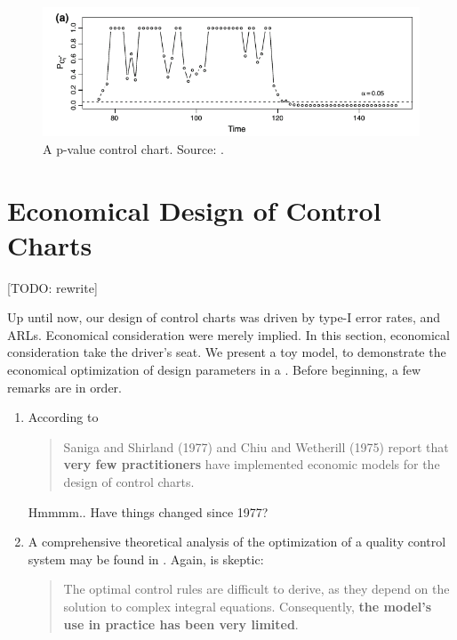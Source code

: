 \begin{figure}[t]
\centering
\includegraphics[width=0.7\linewidth]{art/p-value-chart}
\caption{A p-value control chart. Source: \cite{li_using_2012}.}
\label{fig:p-value-chart}
\end{figure}





\section{Economical Design of Control Charts}
\label{sec:economical_considerations}

[TODO: rewrite]


Up until now, our design of control charts was driven by type-I error rates, and ARLs. Economical consideration were merely implied.
In this section, economical consideration take the driver's seat. 
We present a toy model, to demonstrate the economical optimization of design parameters in a \barxChart. 
Before beginning, a few remarks are in order. 

\begin{remark}
\noindent
\begin{enumerate}
\item According to \cite{montgomery_introduction_2007} 
\begin{quote}
Saniga and Shirland (1977) and Chiu and Wetherill (1975) report that \textbf{very few practitioners} have implemented economic models for the design of control charts.
\end{quote}
Hmmmm.. Have things changed since 1977?
\item A comprehensive theoretical analysis of the optimization of a quality control system may be found in \cite{girshick_bayes_1952}. Again, \cite{montgomery_introduction_2007} is skeptic:
\begin{quote}
The optimal control rules are difficult to derive, as they depend on the solution to complex integral equations. Consequently, \textbf{the model’s use in practice has been very limited}.
\end{quote}
\end{enumerate}
\end{remark}

